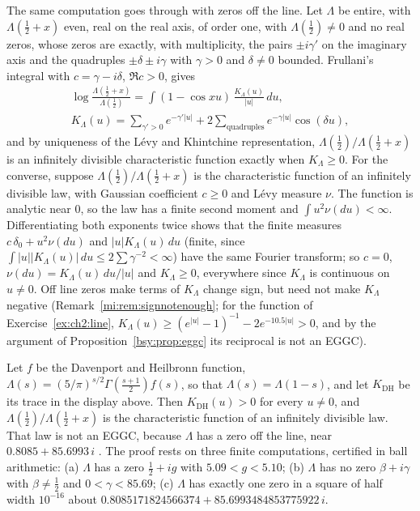 The same computation goes through with zeros off the line. Let $\Lambda$ be entire, with $\Lambda(\frac12+x)$ even, real on the real axis, of order one, with $\Lambda(\frac12)\ne0$ and no real zeros, whose zeros are exactly, with multiplicity, the pairs $\pm i\gamma'$ on the imaginary axis and the quadruples $\pm\delta\pm i\gamma$ with $\gamma>0$ and $\delta\ne0$ bounded. Frullani's integral with $c=\gamma-i\delta$, $\Re c>0$, gives
\[
\begin{gathered}
\log\frac{\Lambda(\frac12+x)}{\Lambda(\frac12)}=\int(1-\cos xu)\,\frac{K_\Lambda(u)}{|u|}\,du,\\
K_\Lambda(u)=\sum_{\gamma'>0}e^{-\gamma'|u|}+2\sum_{\text{quadruples}}e^{-\gamma|u|}\cos(\delta u),
\end{gathered}
\]
and by uniqueness of the L\'evy and Khintchine representation, $\Lambda(\frac12)/\Lambda(\frac12+x)$ is an infinitely divisible characteristic function exactly when $K_\Lambda\ge0$. For the converse, suppose $\Lambda(\frac12)/\Lambda(\frac12+x)$ is the characteristic function of an infinitely divisible law, with Gaussian coefficient $c\ge0$ and L\'evy measure $\nu$. The function is analytic near $0$, so the law has a finite second moment and $\int u^2\nu(du)<\infty$. Differentiating both exponents twice shows that the finite measures $c\,\delta_0+u^2\nu(du)$ and $|u|K_\Lambda(u)\,du$ (finite, since $\int|u||K_\Lambda(u)|\,du\le2\sum\gamma^{-2}<\infty$) have the same Fourier transform; so $c=0$, $\nu(du)=K_\Lambda(u)\,du/|u|$ and $K_\Lambda\ge0$, everywhere since $K_\Lambda$ is continuous on $u\ne0$. Off line zeros make terms of $K_\Lambda$ change sign, but need not make $K_\Lambda$ negative (Remark~\ref{mi:rem:signnotenough}; for the function of Exercise~\ref{ex:ch2:line}, $K_\Lambda(u)\ge(e^{|u|}-1)^{-1}-2e^{-10.5|u|}>0$, and by the argument of Proposition~\ref{bsy:prop:eggc} its reciprocal is not an EGGC).

\begin{theorem}\label{bsy:thm:dhid}
Let $f$ be the Davenport and Heilbronn function, $\Lambda(s)=(5/\pi)^{s/2}\Gamma(\frac{s+1}2)f(s)$, so that $\Lambda(s)=\Lambda(1-s)$, and let $K_{\mathrm{DH}}$ be its trace in the display above. Then $K_{\mathrm{DH}}(u)>0$ for every $u\ne0$, and $\Lambda(\frac12)/\Lambda(\frac12+x)$ is the characteristic function of an infinitely divisible law. That law is not an EGGC, because $\Lambda$ has a zero off the line, near $0.8085+85.6993\,i$ \cite{Spira94,BSO07}. The proof rests on three finite computations, certified in ball arithmetic: (a) $\Lambda$ has a zero $\frac12+ig$ with $5.09<g<5.10$; (b) $\Lambda$ has no zero $\beta+i\gamma$ with $\beta\ne\frac12$ and $0<\gamma<85.69$; (c) $\Lambda$ has exactly one zero in a square of half width $10^{-16}$ about $0.8085171824566374+85.6993484853775922\,i$.
\end{theorem}

